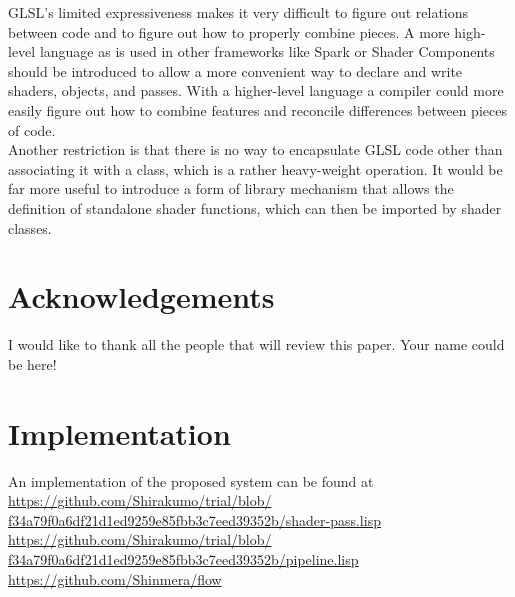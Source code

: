 \documentclass[format=sigconf]{acmart}
\begin{document}
GLSL's limited expressiveness makes it very difficult to figure out relations between code and to figure out how to properly combine pieces. A more high-level language as is used in other frameworks like Spark\cite{spark} or Shader Components\cite{components} should be introduced to allow a more convenient way to declare and write shaders, objects, and passes. With a higher-level language a compiler could more easily figure out how to combine features and reconcile differences between pieces of code. \\

Another restriction is that there is no way to encapsulate GLSL code other than associating it with a class, which is a rather heavy-weight operation. It would be far more useful to introduce a form of library mechanism that allows the definition of standalone shader functions, which can then be imported by shader classes.

\section{Acknowledgements}\label{acknowledgements}
I would like to thank all the people that will review this paper. Your name could be here!

\section{Implementation}\label{implementation}
An implementation of the proposed system can be found at
\\\href{https://github.com/Shirakumo/trial/blob/f34a79f0a6df21d1ed9259e85fbb3c7eed39352b/shader-pass.lisp}{https://github.com/Shirakumo/trial/blob/\\f34a79f0a6df21d1ed9259e85fbb3c7eed39352b/shader-pass.lisp}
\\\href{https://github.com/Shirakumo/trial/blob/f34a79f0a6df21d1ed9259e85fbb3c7eed39352b/pipeline.lisp}{https://github.com/Shirakumo/trial/blob/\\f34a79f0a6df21d1ed9259e85fbb3c7eed39352b/pipeline.lisp}
\\\url{https://github.com/Shinmera/flow} \\


\end{document}
